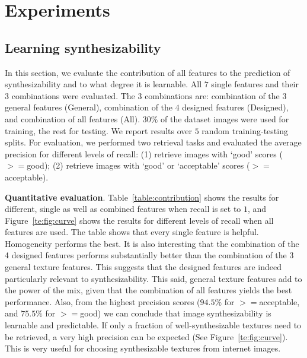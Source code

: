
\section{Experiments}
\label{te:sec:experiment}

\subsection{Learning synthesizability}

In this section, we evaluate the contribution of all features to the
prediction of synthesizability and to what degree it is learnable.
All $7$ single features and their $3$ combinations were
evaluated. The $3$ combinations are: combination of the $3$
general features (General), combination of the $4$ designed features
(Designed), and combination of all features (All).  $30\%$ of the
dataset images were used for training, the rest for testing. We report
results over $5$ random training-testing splits. For evaluation, we
performed two retrieval tasks and evaluated the average precision for
different levels of recall: (1) retrieve images with `good' scores
($>=$good); (2) retrieve images with `good' or `acceptable' scores
($>=$acceptable).


\textbf{Quantitative evaluation}. Table~\ref{table:contribution} shows
the results for different, single as well as combined features when 
recall is set to $1$, and Figure~\ref{te:fig:curve} shows the results for 
different levels of recall when all features are used. The table shows 
that every single feature is helpful. Homogeneity performs the best. 
It is also interesting that the combination of the 4 designed features 
performs substantially better than the combination of the 3 general 
texture features. This suggests that the designed features are indeed
particularly relevant to synthesizability. This said, general texture 
features add to the power of the mix, given that the combination of all 
features yields the best performance. Also, from the highest precision 
scores ($94.5\%$ for $>=$acceptable, and $75.5\%$ for $>=$good) we can 
conclude that image synthesizability is learnable and predictable. If 
only a fraction of well-synthesizable textures need to be retrieved, 
a very high precision can be expected (See Figure~\ref{te:fig:curve}). This 
is very useful for choosing synthesizable textures from internet images. 


